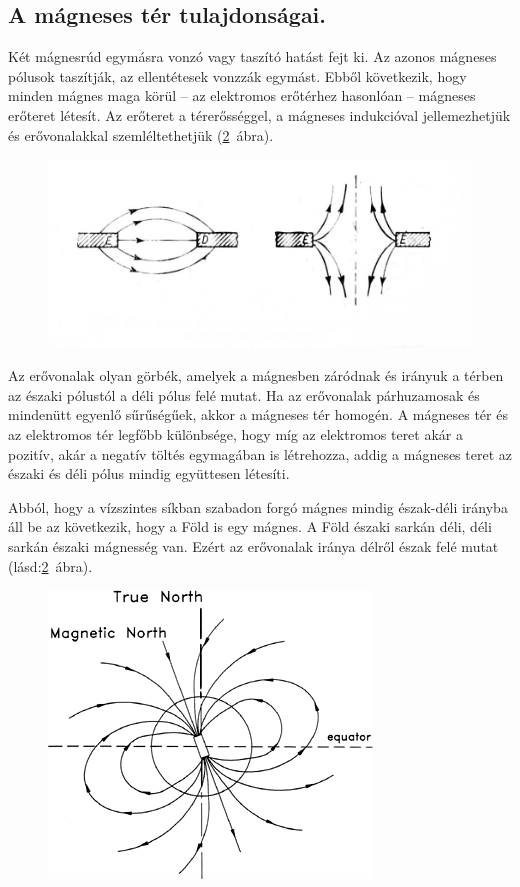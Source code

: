 \subsection{A mágneses tér tulajdonságai. }
Két mágnesrúd egymásra vonzó vagy taszító hatást fejt ki. Az azonos mágneses pólusok taszítják, az ellentétesek vonzzák egymást. Ebből következik, hogy minden mágnes maga körül -- az elektromos erőtérhez hasonlóan -- mágneses erőteret létesít. Az erőteret a térerősséggel, a mágneses indukcióval jellemezhetjük és erővonalakkal szemléltethetjük (\ref{fig:9-eathmagneticfield}~ábra).
\begin{figure}[h]
	\centering
	\includegraphics[width=0.7\linewidth]{fig/9-Magnetic_field}
	\caption{}
	\label{fig:9-magneticfield}
\end{figure}

Az erővonalak olyan görbék, amelyek a mágnesben záródnak és irányuk a térben az északi pólustól a déli pólus felé mutat. Ha az erővonalak párhuzamosak és mindenütt egyenlő sűrűségűek, akkor a mágneses tér homogén. A mágneses tér és az elektromos tér legfőbb különbsége, hogy míg az elektromos teret akár a pozitív, akár a negatív töltés egymagában is létrehozza, addig a mágneses teret az északi és déli pólus mindig együttesen létesíti.

Abból, hogy a vízszintes síkban szabadon forgó mágnes mindig észak-déli irányba áll be az következik, hogy a Föld is egy mágnes. A Föld északi sarkán déli, déli sarkán északi mágnesség van. Ezért az erővonalak iránya délről észak felé mutat (lásd:\ref{fig:9-eathmagneticfield}~ábra).
\begin{figure}[h]
	\centering
	\includegraphics[width=0.3\linewidth]{fig/9-Eath_magnetic_field}
	\caption{}
	\label{fig:9-eathmagneticfield}
\end{figure}

